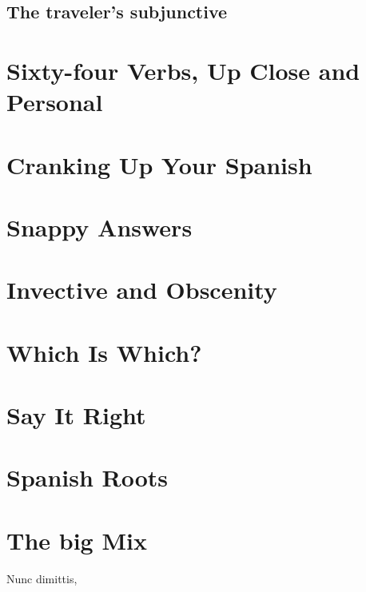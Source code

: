 \documentclass[14pt,a4paper,oneside]{memoir}
\begin{document}
\section{The traveler's subjunctive}

\chapter{Sixty-four Verbs, Up Close and Personal}

\chapter{Cranking Up Your Spanish}

\chapter{Snappy Answers}

\chapter{Invective and Obscenity}

\chapter{Which Is Which?}

\chapter{Say It Right}

\chapter{Spanish Roots}

\chapter{The big Mix}


\begin{flushright}
    {\tiny{Nunc dimittis}, \DTMnow}
\end{flushright}
\end{document}

